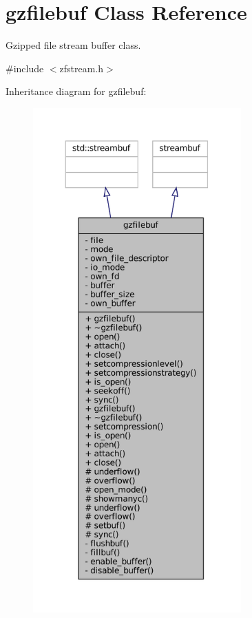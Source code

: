 \hypertarget{classgzfilebuf}{}\section{gzfilebuf Class Reference}
\label{classgzfilebuf}


Gzipped file stream buffer class.  




{\ttfamily \#include $<$zfstream.\+h$>$}



Inheritance diagram for gzfilebuf\+:
\nopagebreak
\begin{figure}[H]
\begin{center}
\leavevmode
\includegraphics[height=550pt]{classgzfilebuf__inherit__graph}
\end{center}
\end{figure}


